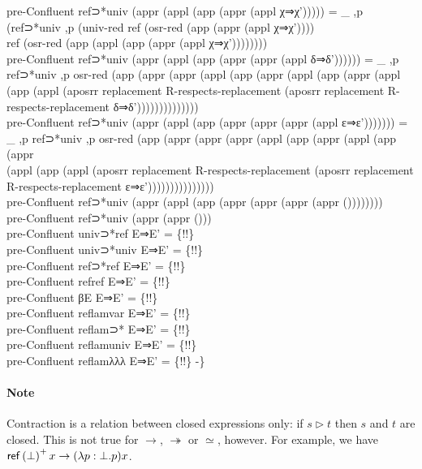 {\begin{code}
{\>pre-Confluent ref⊃*univ (appr (appl (app (appr (appl χ⇒χ'))))) = \_ ,p (ref⊃*univ ,p (univ-red ref (osr-red (app (appr (appl χ⇒χ')))) \<\\
\>  ref (osr-red (app (appl (app (appr (appl χ⇒χ'))))))))\<\\
\>pre-Confluent ref⊃*univ (appr (appl (app (appr (appr (appl δ⇒δ')))))) = \_ ,p ref⊃*univ ,p osr-red (app (appr (appr (appl (app (appr (appl (app (appr (appl \<\\
\>  (app (appl (aposrr replacement R-respects-replacement (aposrr replacement R-respects-replacement δ⇒δ'))))))))))))))\<\\
\>pre-Confluent ref⊃*univ (appr (appl (app (appr (appr (appr (appl ε⇒ε'))))))) = \_ ,p ref⊃*univ ,p osr-red (app (appr (appr (appr (appl (app (appr (appl (app (appr \<\\
\>  (appl (app (appl (aposrr replacement R-respects-replacement (aposrr replacement R-respects-replacement ε⇒ε')))))))))))))))\<\\
\>pre-Confluent ref⊃*univ (appr (appl (app (appr (appr (appr (appr ())))))))\<\\
\>pre-Confluent ref⊃*univ (appr (appr ()))\<\\
\>pre-Confluent univ⊃*ref E⇒E' = \{!!\}\<\\
\>pre-Confluent univ⊃*univ E⇒E' = \{!!\}\<\\
\>pre-Confluent ref⊃*ref E⇒E' = \{!!\}\<\\
\>pre-Confluent refref E⇒E' = \{!!\}\<\\
\>pre-Confluent βE E⇒E' = \{!!\}\<\\
\>pre-Confluent reflamvar E⇒E' = \{!!\}\<\\
\>pre-Confluent reflam⊃* E⇒E' = \{!!\}\<\\
\>pre-Confluent reflamuniv E⇒E' = \{!!\}\<\\
\>pre-Confluent reflamλλλ E⇒E' = \{!!\} -\}}\<%
\\
\>\<%
\end{code}
}

\paragraph{Note}
Contraction is a relation between closed expressions only: if $s \rhd t$ then $s$ and $t$ are closed.  This is not true for $\rightarrow$, $\twoheadrightarrow$ or $\simeq$, however.  For example, we have $\mathsf{ref} \left( {\bot} \right)^+ x \rightarrow (\lambda p:\bot.p)x$.


